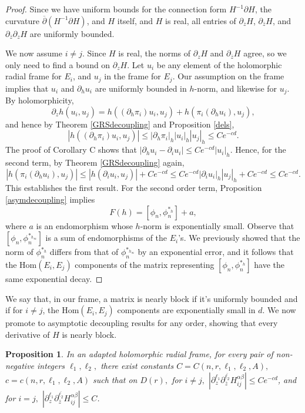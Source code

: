 \documentclass[10pt]{amsart}
\newtheorem{prop}[thm]{Proposition}
\theoremstyle{definition}
\begin{document}
\begin{proof}
Since we have uniform bounds for the connection form $H^{-1}\partial H$, the curvature $\overline{\partial}(H^{-1}\partial H)$, and $H$ itself, and $H$ is real, all entries of $\partial_z H$, $\partial_{\overline{z}}H$, and $\partial_{\overline{z}}\partial_z H$ are uniformly bounded.

We now assume $i\neq j$. Since $H$ is real, the norms of $\partial_z H$ and $\partial_{\overline{z}} H$ agree, so we only need to find a bound on $\partial_z H$. Let $u_i$ be any element of the holomorphic radial frame for $E_i$, and $u_j$ in the frame for $E_j$. Our assumption on the frame implies that $u_i$ and $\partial_h u_i$ are uniformly bounded in $h$-norm, and likewise for $u_j$.  
By holomorphicity, $$\partial_z h(u_i,u_j)=h((\partial_h \pi_i)u_i,u_j) + h(\pi_i (\partial_h u_i), u_j),$$ and hence by Theorem \ref{GRSdecoupling} and Proposition \ref{dels}, 
   $$|h((\partial_h \pi_i)u_i,u_j)|\leq |\partial_h \pi_i|_h |u_i|_h|u_j|_h\leq Ce^{-cd}.$$
The proof of Corollary C shows that $|\partial_h u_i - \partial_i u_i|\leq Ce^{-cd}|u_i|_h.$ Hence, for the second term, by Theorem \ref{GRSdecoupling} again, $$|h(\pi_i (\partial_h u_i), u_j)|\leq |h(\partial_i u_i, u_j)|+Ce^{-cd}\leq Ce^{-cd}|\partial_i u_i|_h |u_j|_h +Ce^{-cd} \leq Ce^{-cd}.$$ This establishes the first result. For the second order term, Proposition \ref{asymdecoupling} implies $$F(h)=[\phi_n,\phi_n^{*_h}] +a,$$ where $a$ is an endomorphism whose $h$-norm is exponentially small. Observe that $[\phi_n,\phi_n^{*_{h_\infty}}]$ is a sum of endomorphisms of the $E_i$'s. We previously showed that the norm of $\phi_n^{*_h}$ differs from that of $\phi_n^{*_{h_\infty}}$ by an exponential error, and it follows that the $\textrm{Hom}(E_i,E_j)$ components of the matrix representing $[\phi_n,\phi_n^{*_h}]$ have the same exponential decay. 
\end{proof}
We say that, in our frame, a matrix is nearly block if it's uniformly bounded and if for $i\neq j$, the $\textrm{Hom}(E_i,E_j)$ components are exponentially small in $d$. We now promote to asymptotic decoupling results for any order, showing that every derivative of $H$ is nearly block. 
\begin{prop}\label{holocalbounds}
    In an adapted holomorphic radial frame, for every pair of non-negative integers $\ell_1,\ell_2,$ there exist constants $C=C(n,r,\ell_1,\ell_2,A),$ $c=c(n,r,\ell_1,\ell_2,A)$ such that on $D(r),$ for $i\neq j,$ $ |\partial_z^{\ell_1}\partial_{\overline{z}}^{\overline{\ell_2}} H_{ij}^{\alpha\beta}|\leq Ce^{-cd}$, and for $i=j,$ $|\partial_z^{\ell_1}\partial_{\overline{z}}^{\overline{\ell_2}} H_{ij}^{\alpha\beta}|\leq C$. 
\end{prop}
\end{document}
